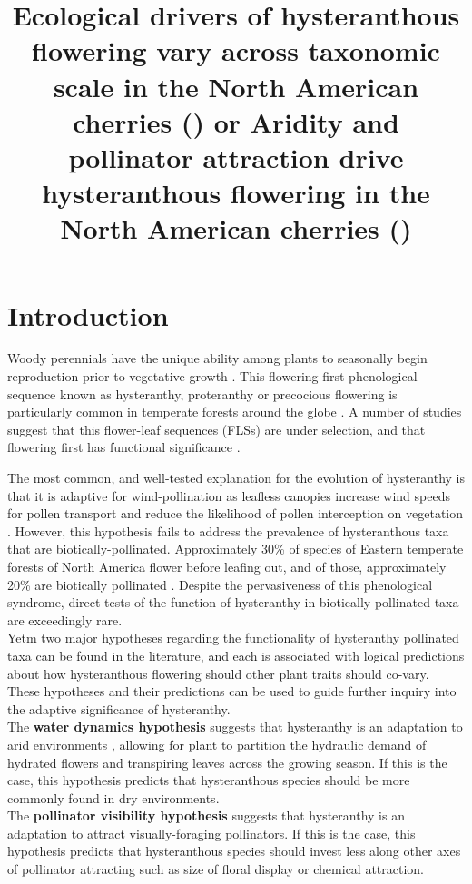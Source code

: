 \documentclass{article}\usepackage[]{graphicx}\usepackage[]{color}
\title{Ecological drivers of hysteranthous flowering vary across taxonomic scale in the North American cherries (\texit{Prunus spp.}) or
Aridity and pollinator attraction drive hysteranthous flowering in the North American cherries (\texit{Prunus spp.})}
\begin{document}
\maketitle


\section*{Introduction}
\noindent Woody perennials have the unique ability among plants to seasonally begin reproduction prior to vegetative growth \citep{}. This flowering-first phenological sequence known as hysteranthy, proteranthy or precocious flowering is particularly common in temperate forests around the globe \citep{}. A number of studies suggest that this flower-leaf sequences (FLSs) are under selection, and that flowering first has functional significance \citep{}.

\noindent The most common, and well-tested explanation for the evolution of hysteranthy is that it is adaptive for wind-pollination as leafless canopies increase wind speeds for pollen transport and reduce the likelihood of pollen interception on vegetation \citep{}. However, this hypothesis fails to address the prevalence of hysteranthous taxa that are biotically-pollinated. Approximately 30\% of species of Eastern temperate forests of North America flower before leafing out, and of those, approximately 20\% are biotically pollinated  \citep{}. Despite the pervasiveness of this phenological syndrome, direct tests of the function of hysteranthy in biotically pollinated taxa are exceedingly rare. \\

Yetm two major hypotheses regarding the functionality of hysteranthy pollinated taxa can be found in the literature, and each is associated with logical predictions about how hysteranthous flowering should other plant traits should co-vary. These hypotheses and their predictions can be used to guide further inquiry into the adaptive significance of hysteranthy.\\

The \textbf{water dynamics hypothesis} \citep{} suggests that hysteranthy is an adaptation to arid environments \citep{}, allowing for plant to partition the hydraulic demand of hydrated flowers and transpiring leaves across the growing season. If this is the case, this hypothesis predicts that hysteranthous species should be more commonly found in dry environments.  \\

The \textbf{pollinator visibility hypothesis} \citep{} suggests that hysteranthy is an adaptation to attract visually-foraging pollinators. If this is the case, this hypothesis predicts that hysteranthous species should invest less along other axes of pollinator attracting such as size of floral display or chemical attraction. \\
\end{document}
